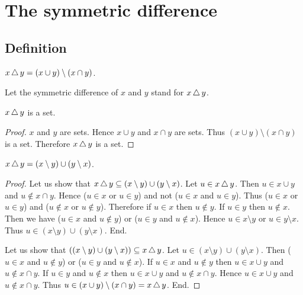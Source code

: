 \documentclass[../../sets-and-functions.ftl.tex]{subfiles}
\begin{document}
  \section{The symmetric difference}

  \subsection{Definition}

  \begin{forthel}
    \begin{definition}
      $x \mathop{\triangle} y = (x \cup y) \setminus (x \cap y)$.
    \end{definition}

    Let the symmetric difference of $x$ and $y$ stand for $x \mathop{\triangle} y$.

    \begin{lemma}
      $x \mathop{\triangle} y$ is a set.
    \end{lemma}
    \begin{proof}
      $x$ and $y$ are sets.
      Hence $x \cup y$ and $x \cap y$ are sets.
      Thus $(x \cup y) \setminus (x \cap y)$ is a set.
      Therefore $x \mathop{\triangle} y$ is a set.
    \end{proof}

    \begin{proposition}[SF 01 04 470605]
      $x \mathop{\triangle} y = (x \setminus y) \cup (y \setminus x)$.
    \end{proposition}
    \begin{proof}
      Let us show that $x \mathop{\triangle} y \subseteq (x \setminus y) \cup
      (y \setminus x)$.
        Let $u \in x \mathop{\triangle} y$.
        Then $u \in x \cup y$ and $u \notin x \cap y$.
        Hence ($u \in x$ or $u \in y$) and not ($u \in x$ and $u \in y$).
        Thus ($u \in x$ or $u \in y$) and ($u \notin x$ or $u \notin y$).
        Therefore if $u \in x$ then $u \notin y$.
        If $u \in y$ then $u \notin x$.
        Then we have ($u \in x$ and $u \notin y$) or ($u \in y$ and
        $u \notin x$).
        Hence $u \in x \setminus y$ or $u \in y \setminus x$.
        Thus $u \in (x \setminus y) \cup (y \setminus x)$.
      End.

      Let us show that $((x \setminus y) \cup (y \setminus x)) \subseteq
      x \mathop{\triangle} y$.
        Let $u \in (x \setminus y) \cup (y \setminus x)$.
        Then ($u \in x$ and $u \notin y$) or ($u \in y$ and $u \notin x$).
        If $u \in x$ and $u \notin y$ then $u \in x \cup y$ and
        $u \notin x \cap y$.
        If $u \in y$ and $u \notin x$ then $u \in x \cup y$ and
        $u \notin x \cap y$.
        Hence $u \in x \cup y$ and $u \notin x \cap y$.
        Thus $u \in (x \cup y) \setminus (x \cap y) = x \mathop{\triangle} y$.
      End.
    \end{proof}
  \end{forthel}
\end{document}
